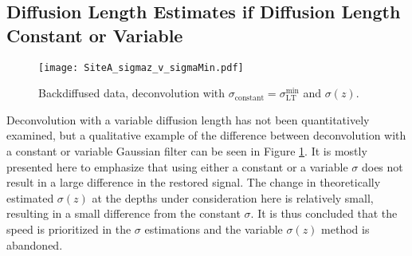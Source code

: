 \documentclass[../../CompleteThesis2/Complete_2ndDraft]{subfiles}
\begin{document}
\subsection[$\sigma$ Constant or Variable]{Diffusion Length Estimates if Diffusion Length Constant or Variable}
\label{Subsec:Results_DiffLenEst_AlphabetCores_SigConstVar}

\begin{figure}[!htb]
	\centering
	\texttt{[image: SiteA\_sigmaz\_v\_sigmaMin.pdf]}
	\caption[Deconvolution with $\sigma_{\text{constant}}$ and $\sigma(z)$]{\small Backdiffused data, deconvolution with $\sigma_{\text{constant}} = \sigma_{\text{LT}}^{\text{min}}$ and $\sigma(z)$.}
	\label{Fig:SiteA_sigmaz_v_sigmaMin}
\end{figure}

Deconvolution with a variable diffusion length has not been quantitatively examined, but a qualitative example of the difference between deconvolution with a constant or variable Gaussian filter can be seen in Figure \ref{Fig:SiteA_sigmaz_v_sigmaMin}. It is mostly presented here to emphasize that using either a constant or a variable $\sigma$ does not result in a large difference in the restored signal. The change in theoretically estimated $\sigma(z)$ at the depths under consideration here is relatively small, resulting in a small difference from the constant $\sigma$. It is thus concluded that the speed is prioritized in the $\sigma$ estimations and the variable $\sigma(z)$ method is abandoned.
%		
%		
%		
\end{document}
